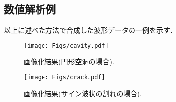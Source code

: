 \subsection{数値解析例}
以上に述べた方法で合成した波形データの一例を示す．
\begin{figure}[h]
	\begin{center}
	\texttt{[image: Figs/cavity.pdf]} 
	\end{center}
	\caption{画像化結果(円形空洞の場合).} 
	\label{fig:cavity}
\end{figure}
\begin{figure}[h]
	\begin{center}
	\texttt{[image: Figs/crack.pdf]} 
	\end{center}
	\caption{画像化結果(サイン波状の割れの場合).} 
	\label{fig:crack}
\end{figure}
